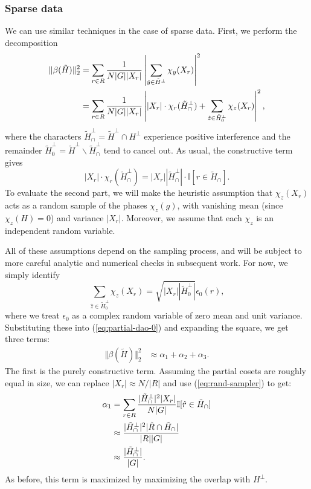 \documentclass[aps, pre,reprint,nofootinbib,citeautoscript,floatfix]{revtex4-1}
\begin{document}
\subsubsection*{Sparse data}

We can use similar techniques in the case of sparse data. First, we perform the decomposition
\begin{align}
    \Vert \beta(\tilde{H})\Vert_2^2 & = \sum_{r \in R}\frac{1}{N|G||X_r|}\left|\sum_{\hat{y}\in \tilde{H}^\perp} \chi_y(X_r)\right|^2 \notag \\
    & = \sum_{r \in R}\frac{1}{N|G||X_r|}\left||X_r| \cdot\chi_r(\tilde{H}^\perp_\cap) + \sum_{\hat{z}\in \tilde{H}^\perp_0} \chi_z(X_r)\right|^2 \label{eq:partial-dao-0},
\end{align}
where the characters $\tilde{H}^\perp_\cap = \tilde{H}^\perp\cap H^\perp$ experience positive interference and the remainder $\tilde{H}^\perp_0 = \tilde{H}^\perp \backslash \tilde{H}^\perp_\cap$ tend to cancel out.
As usual, the constructive term gives
\[
|X_r| \cdot\chi_r(\tilde{H}^\perp_\cap) = |X_r||\tilde{H}^\perp_\cap| \cdot \mathbb{I}[r \in \tilde{H}_\cap].
\]
To evaluate the second part, we will make the heuristic assumption that $\chi_z(X_r)$ acts as a random sample of the phases $\chi_z(g)$, with vanishing mean (since $\chi_z(H) = 0$) and variance $|X_r|$. Moreover, we assume that each $\chi_z$ is an independent random variable.

All of these assumptions depend on the sampling process, and will be subject to more careful analytic and numerical checks in subsequent work. For now, we simply identify
\[
\sum_{\hat{z}\in \tilde{H}^\perp_0} \chi_z(X_r) = \sqrt{|X_r||\tilde{H}^\perp_0|}\epsilon_0(r),
\]
where we treat $\epsilon_0$ as a complex random variable of zero mean and unit variance.
Substituting these into (\ref{eq:partial-dao-0}) and expanding the square, we get three terms:
\begin{align}
    \Vert \beta(\tilde{H})\Vert_2^2 & \approx \alpha_1 + \alpha_2 + \alpha_3.
\end{align}
The first is the purely constructive term.
Assuming the partial cosets are roughly equal in size, we can replace $|X_r| \approx N/|R|$ and use (\ref{eq:rand-sampler}) to get:
\begin{align}
\alpha_1 & = \sum_{r\in R}\frac{|\tilde{H}_\cap^\perp|^2 |X_r|}{N|G|} \mathbb{I}[\hat{r}\in \tilde{H}_\cap] \notag \\
    & \approx \frac{|\tilde{H}_\cap^\perp|^2 |\hat{R}\cap \tilde{H}_\cap|}{|R||G|}  \notag \\
    & \approx \frac{|\tilde{H}_\cap^\perp|}{|G|}.
\end{align}
As before, this term is maximized by maximizing the overlap with $H^\perp$.
\end{document}
